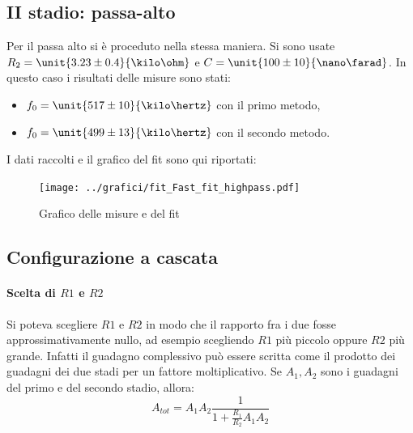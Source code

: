 \documentclass[10pt,a4paper]{article}
\begin{document}
\subsection{II stadio: passa-alto}
Per il passa alto si è proceduto nella stessa maniera. Si sono usate $R_2=\unit{3.23 \pm 0.4}{\kilo\ohm}$ e $C=\unit{100 \pm 10}{\nano\farad}$.
In questo caso i risultati delle misure sono stati:
\begin{itemize}
	\item $f_0 = \unit{517 \pm 10}{\kilo\hertz}$ con il primo metodo,
	\item $f_0 = \unit{499 \pm 13}{\kilo\hertz}$ con il secondo metodo.
\end{itemize}

I dati raccolti e il grafico del fit sono qui riportati:

\begin{figure}[h!]
	\centering
	
\end{figure}
	
\begin{figure}[h!]
	\centering
	\texttt{[image: ../grafici/fit\_Fast\_fit\_highpass.pdf]}
	\caption{Grafico delle misure e del fit}
\end{figure}
\subsection{Configurazione a cascata}

\paragraph{Scelta di $R1$ e $R2$} Si poteva scegliere $R1$ e $R2$ in modo che il rapporto fra i due fosse approssimativamente nullo, ad esempio scegliendo $R1$ più piccolo oppure $R2$ più grande.
Infatti il guadagno complessivo può essere scritta come il prodotto dei guadagni dei due stadi per un fattore moltiplicativo. Se $A_1, A_2$ sono i guadagni del primo e del secondo stadio, allora:
\begin{equation*}
A_{tot} = A_1 A_2 \frac{1}{1 + \frac{R_1}{R_2} A_1 A_2}
\end{equation*}


\end{document}

